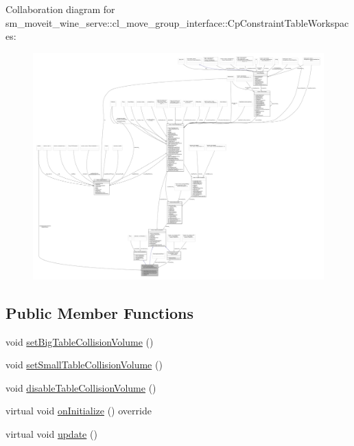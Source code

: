 Collaboration diagram for sm\+\_\+moveit\+\_\+wine\+\_\+serve\+:\+:cl\+\_\+move\+\_\+group\+\_\+interface\+:\+:Cp\+Constraint\+Table\+Workspaces\+:
\nopagebreak
\begin{figure}[H]
\begin{center}
\leavevmode
\includegraphics[width=350pt]{classsm__moveit__wine__serve_1_1cl__move__group__interface_1_1CpConstraintTableWorkspaces__coll__graph}
\end{center}
\end{figure}
\subsection*{Public Member Functions}
\begin{DoxyCompactItemize}
\item 
void \hyperlink{classsm__moveit__wine__serve_1_1cl__move__group__interface_1_1CpConstraintTableWorkspaces_aadce0ed924f3ea475d0bb7f892b18db9}{set\+Big\+Table\+Collision\+Volume} ()
\item 
void \hyperlink{classsm__moveit__wine__serve_1_1cl__move__group__interface_1_1CpConstraintTableWorkspaces_ab059b21be65d4b79c14d73483e9ebfc6}{set\+Small\+Table\+Collision\+Volume} ()
\item 
void \hyperlink{classsm__moveit__wine__serve_1_1cl__move__group__interface_1_1CpConstraintTableWorkspaces_a148f92278be1a7f9d4c6308d4971ea45}{disable\+Table\+Collision\+Volume} ()
\item 
virtual void \hyperlink{classsm__moveit__wine__serve_1_1cl__move__group__interface_1_1CpConstraintTableWorkspaces_a7bb129fe7744909e2238ed94e61e3c30}{on\+Initialize} () override
\item 
virtual void \hyperlink{classsm__moveit__wine__serve_1_1cl__move__group__interface_1_1CpConstraintTableWorkspaces_af14a8a8c61b0dcfa6b062ba8493d5a5d}{update} ()
\end{DoxyCompactItemize}

